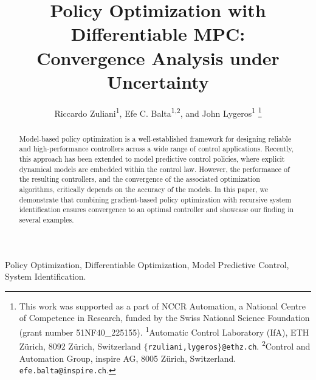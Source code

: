 \documentclass[journal,twoside,web,final]{ieeecolor}
\theoremstyle{definition}
\begin{document}

\title{Policy Optimization with Differentiable MPC: \\ Convergence Analysis under Uncertainty}

\author{
    Riccardo Zuliani\textsuperscript{1}, %
    Efe C. Balta\textsuperscript{1,2}, %
    and John Lygeros\textsuperscript{1} %
    \thanks{
        This work was supported as a part of NCCR Automation, 
        a National Centre of Competence in Research, 
        funded by the Swiss National Science Foundation (grant number 51NF40\_225155). 
        \textsuperscript{1}Automatic Control Laboratory (IfA), 
        ETH Z\"urich, 8092 Z\"urich, Switzerland 
        \texttt{\small$\{$rzuliani,lygeros$\}$@ethz.ch}. 
        \textsuperscript{2}Control and Automation Group, inspire AG, 
        8005 Z\"urich, Switzerland. 
        \texttt{\small efe.balta@inspire.ch}.
    }   
}

\maketitle

\begin{abstract}
Model-based policy optimization is a well-established framework for designing reliable and high-performance %
controllers across a wide range of control applications. 
Recently, this approach has been extended to model predictive control policies, 
where explicit dynamical models are embedded within the control law. 
However, the performance of the resulting controllers, 
and the convergence of the associated optimization algorithms, critically depends on the accuracy of the models.
In this paper, we demonstrate that combining gradient-based policy optimization with recursive system %
identification ensures convergence to an optimal controller and showcase our finding in several examples.
\end{abstract}

\begin{IEEEkeywords}
Policy Optimization, Differentiable Optimization, Model Predictive Control, System Identification.
\end{IEEEkeywords}
\end{document}
